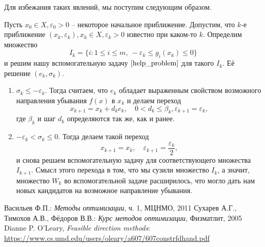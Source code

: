 \documentclass{article}
\theoremstyle{plain}
\theoremstyle{definition}
\begin{document}
Для избежания таких явлений, мы поступим следующим образом.

Пусть $x_0 \in X, \varepsilon_0 > 0$ -- некоторое начальное приближение. Допустим, что $k$-е приближение $(x_k, \varepsilon_k), x_k \in X, \varepsilon_k > 0$ известно при каком-то $k$. Определим множество
\begin{equation}
I_k = \lbrace i: 1 \leqslant i \leqslant m,~ -\varepsilon_k \leqslant g_i(x_k) \leqslant 0 \rbrace
\end{equation}
и решим нашу вспомогательную задачу $\eqref{help_problem}$ для такого $I_k$. Её решение $(e_k, \sigma_k)$.
\begin{enumerate}
\item $\sigma_k \leqslant -\varepsilon_k$. Тогда считаем, что $e_k$ обладает выраженным свойством возможного направления убывания $f(x)$ в $x_k$ и делаем переход
\begin{equation}
x_{k+1} = x_k + d_k e_k,\quad 0 < d_k \leqslant \beta_k, \varepsilon_{k+1} = \varepsilon_k,
\end{equation}
где $\beta_k$ и шаг $d_k$ определяются так же, как и ранее.

\item $-\varepsilon_k < \sigma_k \leqslant 0$. Тогда делаем такой переход
\begin{equation}
x_{k+1} = x_k, \quad \varepsilon_{k+1} = \frac{\varepsilon_k}{2},
\end{equation}
и снова решаем вспомогательную задачу для соответствующего множества $I_{k+1}$.
Смысл этого перехода в том, что мы сузили множество $I_k$, а значит, множество $W_k$ во вспомогательной задаче расширилось, что могло дать нам новых кандидатов на возможное направление убывания.
\end{enumerate}


 




\newpage
\begin{thebibliography}{3}
 Васильев Ф.П.: \emph{Методы оптимизации}, ч. 1, МЦНМО, 2011
 Сухарев А.Г., Тимохов А.В., Фёдоров В.В.: \emph{Курс методов оптимизации}, Физматлит, 2005
 Dianne P. O’Leary, \emph{Feasible direction methods}: \url{https://www.cs.umd.edu/users/oleary/a607/607constrfdhand.pdf}
\end{thebibliography}
\end{document}

